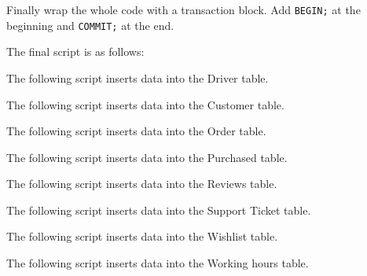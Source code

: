 Finally wrap the whole code with a transaction block. Add \texttt{BEGIN;} at the beginning and \texttt{COMMIT;} at the end.

The final script is as follows:



The following script inserts data into the Driver table.



The following script inserts data into the Customer table.



The following script inserts data into the Order table.



The following script inserts data into the Purchased table.



The following script inserts data into the Reviews table.



The following script inserts data into the Support Ticket table.



The following script inserts data into the Wishlist table.



The following script inserts data into the Working hours table.



